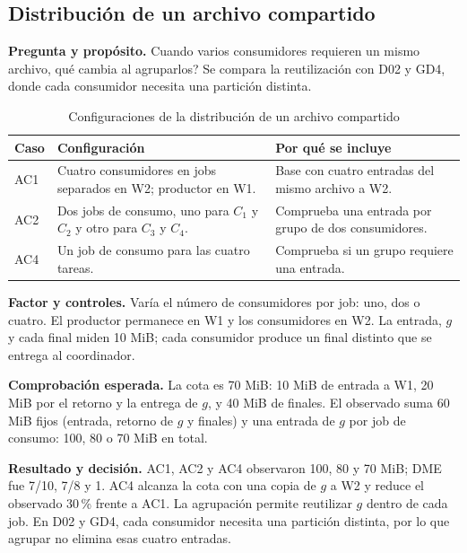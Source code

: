 \subsection{Distribución de un archivo compartido}
\label{sec:prueba_b}
\textbf{Pregunta y propósito.} Cuando varios consumidores requieren un mismo archivo, \textquestiondown{}qué cambia al agruparlos? Se compara la reutilización con D02 y GD4, donde cada consumidor necesita una partición distinta.

\begin{table}[htbp]\centering\small
\caption{Configuraciones de la distribución de un archivo compartido}
\begin{tabularx}{\linewidth}{@{}P{1.3cm}YY@{}}
\toprule Caso & Configuración & Por qué se incluye\\\midrule
AC1 & Cuatro consumidores en jobs separados en W2; productor en W1. & Base con cuatro entradas del mismo archivo a W2.\\
AC2 & Dos jobs de consumo, uno para $C_1$ y $C_2$ y otro para $C_3$ y $C_4$. & Comprueba una entrada por grupo de dos consumidores.\\
AC4 & Un job de consumo para las cuatro tareas. & Comprueba si un grupo requiere una entrada.\\
\bottomrule
\end{tabularx}
\end{table}

\textbf{Factor y controles.} Varía el número de consumidores por job: uno, dos o cuatro. El productor permanece en W1 y los consumidores en W2. La entrada, $g$ y cada final miden 10 MiB; cada consumidor produce un final distinto que se entrega al coordinador.

\textbf{Comprobación esperada.} La cota es 70 MiB: 10 MiB de entrada a W1, 20 MiB por el retorno y la entrega de $g$, y 40 MiB de finales. El observado suma 60 MiB fijos (entrada, retorno de $g$ y finales) y una entrada de $g$ por job de consumo: 100, 80 o 70 MiB en total.

\textbf{Resultado y decisión.} AC1, AC2 y AC4 observaron 100, 80 y 70 MiB; DME fue 7/10, 7/8 y 1. AC4 alcanza la cota con una copia de $g$ a W2 y reduce el observado 30\,\% frente a AC1. La agrupación permite reutilizar $g$ dentro de cada job. En D02 y GD4, cada consumidor necesita una partición distinta, por lo que agrupar no elimina esas cuatro entradas.
